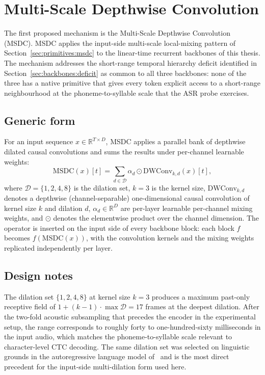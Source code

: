 \section{Multi-Scale Depthwise Convolution}\label{sec:proposed:msdc}

The first proposed mechanism is the Multi-Scale Depthwise Convolution
(MSDC). MSDC applies the input-side multi-scale local-mixing
pattern of Section~\ref{sec:primitives:msdc} to the linear-time
recurrent backbones of this thesis. The mechanism addresses the
short-range temporal hierarchy deficit identified in
Section~\ref{sec:backbones:deficit} as common to all three backbones:
none of the three has a native primitive that gives every token
explicit access to a short-range neighbourhood at the
phoneme-to-syllable scale that the ASR probe exercises.

\subsection{Generic form}

For an input sequence $x \in \mathbb{R}^{T \times D}$, MSDC applies a
parallel bank of depthwise dilated causal convolutions and sums the
results under per-channel learnable weights:
\begin{equation}\label{eq:msdc-generic}
\mathrm{MSDC}(x)[t] = \sum_{d \in \mathcal{D}} \alpha_{d} \odot \mathrm{DWConv}_{k, d}(x)[t],
\end{equation}
where $\mathcal{D} = \{1, 2, 4, 8\}$ is the dilation set, $k = 3$ is
the kernel size, $\mathrm{DWConv}_{k, d}$ denotes a depthwise
(channel-separable) one-dimensional causal convolution of kernel size
$k$ and dilation $d$, $\alpha_{d} \in \mathbb{R}^{D}$ are per-layer
learnable per-channel mixing weights, and $\odot$ denotes the
elementwise product over the channel dimension. The operator is
inserted on the input side of every backbone block: each block $f$
becomes $f(\mathrm{MSDC}(x))$, with the convolution kernels and the
mixing weights replicated independently per layer.

\subsection{Design notes}

The dilation set $\{1, 2, 4, 8\}$ at kernel size $k = 3$ produces a
maximum past-only receptive field of $1 + (k - 1) \cdot \max \mathcal{D} = 17$
frames at the deepest dilation. After the two-fold acoustic
subsampling that precedes the encoder in the experimental setup, the
range corresponds to roughly forty to one-hundred-sixty milliseconds
in the input audio, which matches the phoneme-to-syllable scale
relevant to character-level CTC decoding. The same dilation set was
selected on linguistic grounds in the autoregressive language model
of~\citet{kiruluta2025breaking} and is the most direct precedent for
the input-side multi-dilation form used here.

